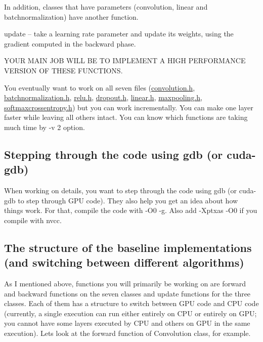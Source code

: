 In addition, classes that have parameters (convolution, linear and batchnormalization) have another function.


\begin{DoxyItemize}
\item update -- take a learning rate parameter and update its weights, using the gradient computed in the backward phase.
\end{DoxyItemize}



 Y\+O\+UR M\+A\+IN J\+OB W\+I\+LL BE TO I\+M\+P\+L\+E\+M\+E\+NT A H\+I\+GH P\+E\+R\+F\+O\+R\+M\+A\+N\+CE V\+E\+R\+S\+I\+ON OF T\+H\+E\+SE F\+U\+N\+C\+T\+I\+O\+NS. 



You eventually want to work on all seven files (\hyperlink{convolution_8h}{convolution.\+h}, \hyperlink{batchnormalization_8h}{batchnormalization.\+h}, \hyperlink{relu_8h}{relu.\+h}, \hyperlink{dropout_8h}{dropout.\+h}, \hyperlink{linear_8h}{linear.\+h}, \hyperlink{maxpooling_8h}{maxpooling.\+h}, \hyperlink{softmaxcrossentropy_8h}{softmaxcrossentropy.\+h}) but you can work incrementally. You can make one layer faster while leaving all others intact. You can know which functions are taking much time by -\/v 2 option.

\subsection*{Stepping through the code using gdb (or cuda-\/gdb) }

When working on details, you want to step through the code using gdb (or cuda-\/gdb to step through G\+PU code). They also help you get an idea about how things work. For that, compile the code with -\/\+O0 -\/g. Also add -\/\+Xptxas -\/\+O0 if you compile with nvcc.

\subsection*{The structure of the baseline implementations (and switching between different algorithms) }

As I mentioned above, functions you will primarily be working on are forward and backward functions on the seven classes and update functions for the three classes. Each of them has a structure to switch between G\+PU code and C\+PU code (currently, a single execution can run either entirely on C\+PU or entirely on G\+PU; you cannot have some layers executed by C\+PU and others on G\+PU in the same execution). Let\textquotesingle{}s look at the forward function of Convolution class, for example.


